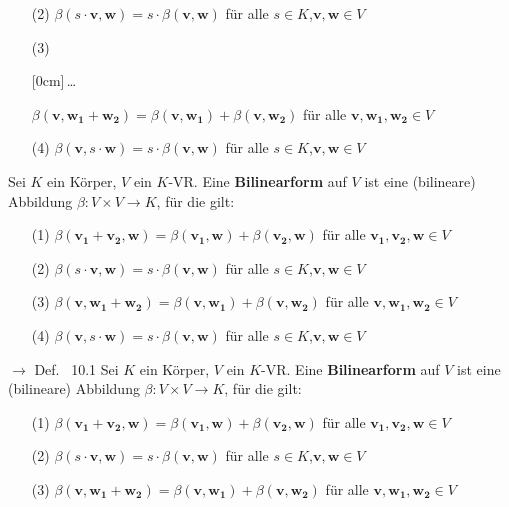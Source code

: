 \documentclass[11pt]{article}
\renewcommand{\cite}[1]{\par\bigskip\hfill{\color{gray}\tiny\(\to\) #1}}
\renewcommand{\vec}[1]{\mathbf{#1}}
\newcommand{\hide}[1]{\parbox{0cm}{\raisebox{-7pt}[0cm]{\dots}}\color{white}#1\color{black}}
\let\olddots\dots
\renewcommand{\dots}{\,\olddots\,}
\newenvironment{field}{}{\newpage}
\newif\ifnote
\newenvironment{note}{\notetrue}{\notefalse}
\begin{document}
\begin{note}
\begin{field}
\begin{itemize}
        \item[(2)] \(\beta(s\cdot\vec{v},\vec{w}) = s\cdot\beta(\vec{v},\vec{w})\) für alle \(s\in K\),\(\vec{v},\vec{w}\in V\)
        \item[(3)]\hide{\(\beta(\vec{v}, \vec{w_1} + \vec{w_2}) = \beta(\vec{v}, \vec{w_1}) + \beta(\vec{v}, \vec{w_2})\) für alle \(\vec{v, w_1, w_2} \in V\)}
        \item[(4)]\(\beta(\vec{v},s\cdot\vec{w}) = s\cdot\beta(\vec{v},\vec{w})\) für alle \(s\in K\),\(\vec{v},\vec{w}\in V\)
    \end{itemize}
    \end{field}
    \begin{field} %
    Sei \(K\) ein Körper, \(V\) ein \(K\)-VR. Eine \textbf{Bilinearform} auf \(V\) ist eine (bilineare) Abbildung  \(\beta\colon V\times V \to K\), für die gilt:
    \begin{itemize}
        \item[(1)] \(\beta(\vec{v_1} + \vec{v_2}, \vec{w}) = \beta(\vec{v_1}, \vec{w}) + \beta(\vec{v_2}, \vec{w})\) für alle \(\vec{v_1, v_2, w} \in V\)
        \item[(2)] \(\beta(s\cdot\vec{v},\vec{w}) = s\cdot\beta(\vec{v},\vec{w})\) für alle \(s\in K\),\(\vec{v},\vec{w}\in V\)
        \item[(3)]\(\beta(\vec{v}, \vec{w_1} + \vec{w_2}) = \beta(\vec{v}, \vec{w_1}) + \beta(\vec{v}, \vec{w_2})\) für alle \(\vec{v, w_1, w_2} \in V\)
        \item[(4)]\(\beta(\vec{v},s\cdot\vec{w}) = s\cdot\beta(\vec{v},\vec{w})\) für alle \(s\in K\),\(\vec{v},\vec{w}\in V\)
    \end{itemize}
    \cite{Def. ~10.1}
    \end{field}
    \begin{field} %
    Sei \(K\) ein Körper, \(V\) ein \(K\)-VR. Eine \textbf{Bilinearform} auf \(V\) ist eine (bilineare) Abbildung  \(\beta\colon V\times V \to K\), für die gilt:
    \begin{itemize}
        \item[(1)] \(\beta(\vec{v_1} + \vec{v_2}, \vec{w}) = \beta(\vec{v_1}, \vec{w}) + \beta(\vec{v_2}, \vec{w})\) für alle \(\vec{v_1, v_2, w} \in V\)
        \item[(2)] \(\beta(s\cdot\vec{v},\vec{w}) = s\cdot\beta(\vec{v},\vec{w})\) für alle \(s\in K\),\(\vec{v},\vec{w}\in V\)
        \item[(3)]\(\beta(\vec{v}, \vec{w_1} + \vec{w_2}) = \beta(\vec{v}, \vec{w_1}) + \beta(\vec{v}, \vec{w_2})\) für alle \(\vec{v, w_1, w_2} \in V\)

\end{itemize}
\end{field}
\end{note}
\end{document}

